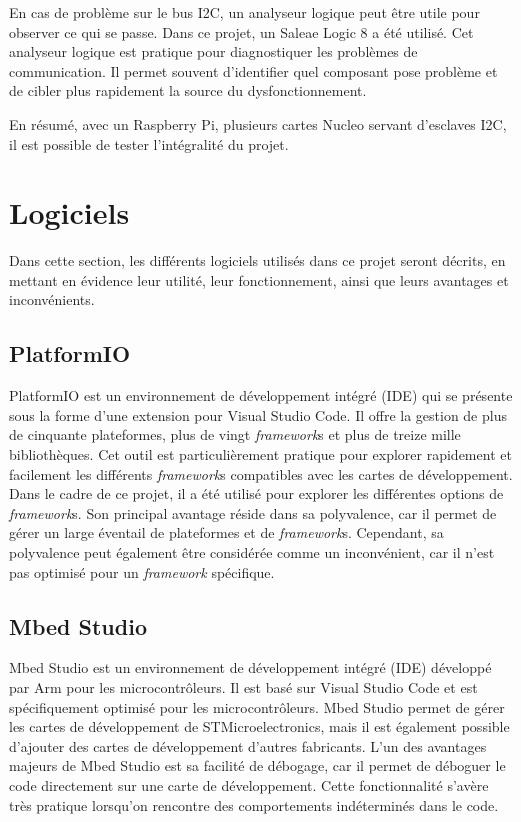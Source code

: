 En cas de problème sur le bus I2C, un analyseur logique peut être utile pour observer ce qui se passe.
Dans ce projet, un Saleae Logic 8 a été utilisé.
Cet analyseur logique est pratique pour diagnostiquer les problèmes de communication.
Il permet souvent d'identifier quel composant pose problème et de cibler plus rapidement la source du dysfonctionnement.

En résumé, avec un Raspberry Pi, plusieurs cartes Nucleo servant d'esclaves I2C, il est possible de tester l'intégralité du projet.

\section{Logiciels}

Dans cette section, les différents logiciels utilisés dans ce projet seront décrits, en mettant en évidence leur utilité, leur fonctionnement, ainsi que leurs avantages et inconvénients.

\subsection{PlatformIO}

PlatformIO est un environnement de développement intégré (IDE) qui se présente sous la forme d'une extension pour Visual Studio Code.
Il offre la gestion de plus de cinquante plateformes, plus de vingt \textit{\gls{framework}}s et plus de treize mille bibliothèques.
Cet outil est particulièrement pratique pour explorer rapidement et facilement les différents \textit{\gls{framework}}s compatibles avec les cartes de développement.
Dans le cadre de ce projet, il a été utilisé pour explorer les différentes options de \textit{\gls{framework}}s.
Son principal avantage réside dans sa polyvalence, car il permet de gérer un large éventail de plateformes et de \textit{\gls{framework}}s.
Cependant, sa polyvalence peut également être considérée comme un inconvénient, car il n'est pas optimisé pour un \textit{\gls{framework}} spécifique.

\subsection{Mbed Studio}

Mbed Studio est un environnement de développement intégré (IDE) développé par Arm pour les microcontrôleurs.
Il est basé sur Visual Studio Code et est spécifiquement optimisé pour les microcontrôleurs.
Mbed Studio permet de gérer les cartes de développement de STMicroelectronics, mais il est également possible d'ajouter des cartes de développement d'autres fabricants.
L'un des avantages majeurs de Mbed Studio est sa facilité de débogage, car il permet de déboguer le code directement sur une carte de développement.
Cette fonctionnalité s'avère très pratique lorsqu'on rencontre des comportements indéterminés dans le code.

